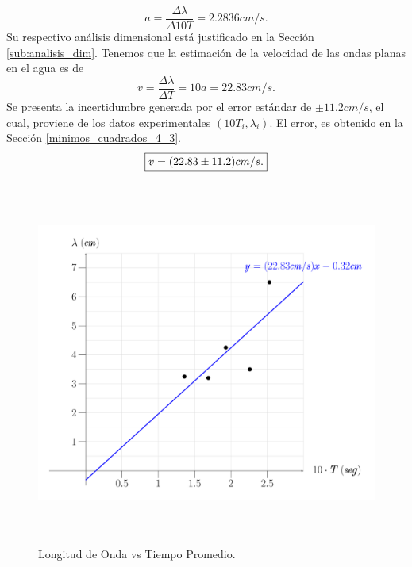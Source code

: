 \documentclass[12pt,a4paper]{article}
\begin{document}
\[
	a = \dfrac{\Delta \lambda}{\Delta 10T} = 2.2836 cm/s.
\]
Su respectivo análisis dimensional está justificado en la Sección \ref{sub:analisis_dim}. Tenemos que la estimación de la velocidad de las ondas planas en el agua es de
\[
	v = \dfrac{\Delta \lambda}{\Delta T} = 10a= 22.83cm/s.
\]
Se presenta la incertidumbre generada por el error estándar de \(\pm 11.2cm/s\), el cual, proviene de los datos experimentales \((10T_i, \lambda _i)\). El error, es obtenido en la Sección \ref{minimos_cuadrados_4_3}.
\[
	\fbox{\(v = (22.83 \pm 11.2) cm/s\).}
\]
\vspace{-1cm}
\begin{figure}[ht]
	\centering
	\includegraphics[height = 12cm]{IMAGENES/SECCION_4_3/tikz.pdf}
	\caption{Longitud de Onda vs Tiempo Promedio.}
	\label{fig:lon_onda_vs_tiempo}
\end{figure}
\newpage
\end{document}
